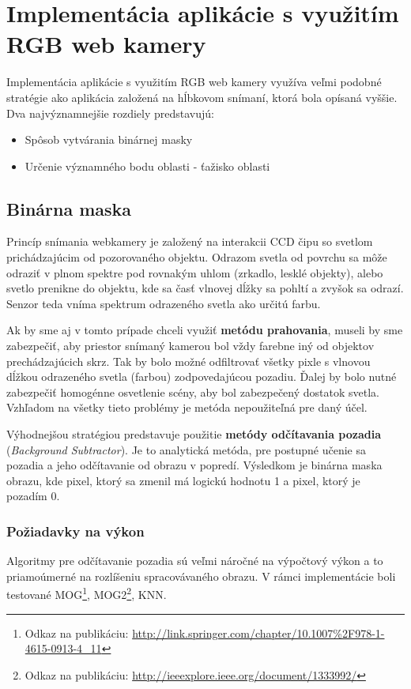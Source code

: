 \section{Implementácia aplikácie s využitím RGB web kamery}
Implementácia aplikácie s využitím RGB web kamery využíva veľmi podobné stratégie ako aplikácia založená na hĺbkovom snímaní, ktorá bola opísaná vyššie. Dva najvýznamnejšie rozdiely predstavujú:
\begin{itemize}
\item Spôsob vytvárania binárnej masky
\item Určenie významného bodu oblasti - ťažisko oblasti
\end{itemize}

\subsection{Binárna maska}
Princíp snímania webkamery je založený na interakcii CCD čipu  so svetlom prichádzajúcim od pozorovaného objektu. Odrazom svetla od povrchu sa môže odraziť v plnom spektre pod rovnakým uhlom (zrkadlo, lesklé objekty), alebo svetlo prenikne do objektu, kde sa časť vlnovej dĺžky sa pohltí a zvyšok sa odrazí. Senzor teda vníma spektrum odrazeného svetla ako určitú farbu.

Ak by sme aj v tomto prípade chceli využiť \textbf{metódu prahovania}, museli by sme zabezpečiť, aby priestor snímaný kamerou bol vždy farebne iný od objektov prechádzajúcich skrz. Tak by bolo možné odfiltrovať všetky pixle s vlnovou dĺžkou odrazeného svetla (farbou) zodpovedajúcou pozadiu. Ďalej by bolo nutné zabezpečiť homogénne osvetlenie scény, aby bol zabezpečený dostatok svetla. Vzhľadom na všetky tieto problémy je metóda nepoužiteľná pre daný účel.

Výhodnejšou stratégiou predstavuje použitie \textbf{metódy odčítavania pozadia} (\textit{Background Subtractor}). Je to analytická metóda, pre postupné učenie sa pozadia a jeho odčítavanie od obrazu v popredí. Výsledkom je binárna maska obrazu, kde pixel, ktorý sa zmenil má logickú hodnotu 1 a pixel, ktorý je pozadím 0. 

\subsubsection{Požiadavky na výkon}
Algoritmy pre odčítavanie pozadia sú veľmi náročné na výpočtový výkon a to priamoúmerné na rozlíšeniu spracovávaného obrazu. V rámci implementácie boli testované MOG\footnote{Odkaz na publikáciu: \url{http://link.springer.com/chapter/10.1007\%2F978-1-4615-0913-4_11}}, MOG2\footnote{Odkaz na publikáciu: \url{http://ieeexplore.ieee.org/document/1333992/}}, KNN.

